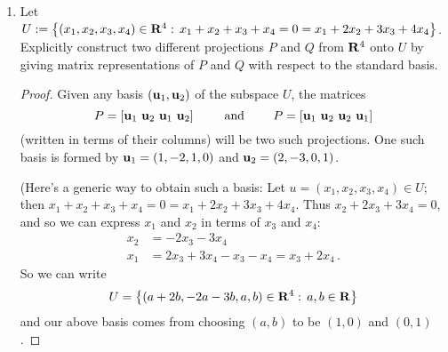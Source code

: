 \documentclass[11pt]{amsart}
\begin{document}
\begin{enumerate}[(1)]
\begin{proof}
\begin{enumerate}
If $MN = ND$, then
\[
  M(N[k]) = (MN)[k] = (ND)[k] = D[k,k] \, N[k] \, ,
\]
in other words, $N[k]$ is an eigenvector of $M$ with eigenvalue $D[k,k]$.

Converseley, if the $D[k,k]$'s are the eigenvalues of $M$, each coming with the eigenvector $N[k]$, then
\[
  (MN)[k] = M(N[k]) = D[k,k] \, N[k] = (ND)[k] \, ,
\]
that is, the columns of the matrices $MN$ and $ND$ are identical. But that means $MN=ND$.

\item Suppose $N$ is invertible and $M = N D N^{ -1 }$.
The latter implies (by multiplying $N$ on the right) $MN=ND$, and so by (a), the columns of $N$ are the eigenvectors of $M$.
Since $N$ is invertible, these eigenvectors form a basis of $\F^n$, and so (by a theorem proved in class) $M$ is diagonizable. \qedhere

\end{enumerate}
\end{proof}

\item Let $U := \left\{ \left( x_1, x_2, x_3, x_4 \right) \in \mathbf{R}^4 : \, x_1 + x_2 + x_3 + x_4 = 0 = x_1 + 2 x_2 + 3 x_3 + 4 x_4 \right\}$.
Explicitly construct two different projections $P$ and $Q$ from $\mathbf{R}^4$ onto $U$ by giving matrix representations of $P$ and $Q$ with respect to the standard basis.

\begin{proof}
Given any basis $(\mathbf u_1, \mathbf u_2)$ of the subspace $U$, the matrices
\[
  P = \left[ \mathbf u_1 \ \mathbf u_2 \ \mathbf u_1 \ \mathbf u_2 \right]
  \qquad \text{ and } \qquad
  P = \left[ \mathbf u_1 \ \mathbf u_2 \ \mathbf u_2 \ \mathbf u_1 \right]
\]
(written in terms of their columns) will be two such projections.
One such basis is formed by $\mathbf u_1 = (1,-2,1,0)$ and $\mathbf u_2 = (2,-3,0,1)$.

(Here's a generic way to obtain such a basis:
Let $u = \left( x_1, x_2, x_3, x_4 \right) \in U$; then $x_1 + x_2 + x_3 + x_4 = 0 = x_1 + 2 x_2 + 3 x_3 + 4 x_4$.
Thus $x_2 + 2 x_3 + 3 x_4 = 0$, and so we can express $x_1$ and $x_2$ in terms of $x_3$ and $x_4$:
\begin{align*}
  x_2 &= -2 x_3 - 3 x_4 \\
  x_1 &= 2 x_3 + 3 x_4 - x_3 - x_4 = x_3 + 2 x_4 \, .
\end{align*}
So we can write
\[
  U = \left\{ \left( a+2b, -2a-3b, a, b \right) \in \mathbf{R}^4 : \, a, b \in \mathbf{R} \right\}
\]
and our above basis comes from choosing $(a,b)$ to be $(1,0)$ and $(0,1)$.
\end{proof}

\end{enumerate}
\end{document}
